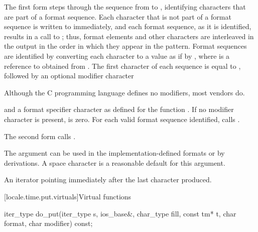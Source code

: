 \begin{itemdescr}
\pnum
\effects
The first form steps through the sequence
from  to ,
identifying characters that are part of a format sequence.
Each character that is not part of a format sequence
is written to  immediately, and
each format sequence, as it is identified, results in a call to ;
thus, format elements and other characters are interleaved in the output
in the order in which they appear in the pattern.
Format sequences are identified by converting each character  to
a  value as if by ,
where  is a reference to 
obtained from .
The first character of each sequence is equal to ,
followed by an optional modifier character 
\begin{footnote}
Although the C programming language defines no modifiers, most vendors do.
\end{footnote}
and a format specifier character 
as defined for the function .
If no modifier character is present,  is zero.
For each valid format sequence identified,
calls .

\pnum
The second form calls .

\pnum
\begin{note}
The  argument can be used
in the implementation-defined formats or by derivations.
A space character is a reasonable default for this argument.
\end{note}

\pnum
\returns
An iterator pointing immediately after the last character produced.
\end{itemdescr}

[locale.time.put.virtuals]{Virtual functions}

%
\begin{itemdecl}
iter_type do_put(iter_type s, ios_base&, char_type fill, const tm* t,
                 char format, char modifier) const;
\end{itemdecl}

